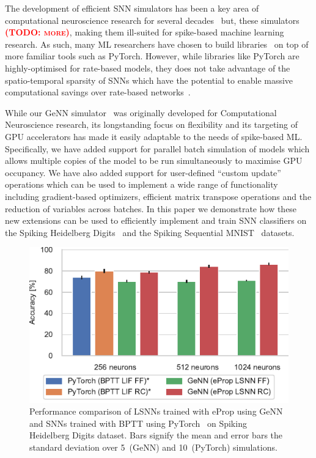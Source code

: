 \documentclass[sigconf,authordraft]{acmart}
\newcommand{\todo}[1]{\textbf{\textsc{\textcolor{red}{(TODO: #1)}}}}
\begin{document}
The development of efficient SNN simulators has been a key area of computational neuroscience research for several decades~\citep{carnevale2006neuron, Gewaltig2007, Golosio2021, Akar2019,Yavuz2016} but, these simulators \todo{more}, making them ill-suited for spike-based machine learning research.
As such, many ML researchers have chosen to build libraries~\citep{norse2021, SpikingJelly, eshraghian2021training,Hazan2018} on top of more familiar tools such as PyTorch.
However, while libraries like PyTorch are highly-optimised for rate-based models, they does not take advantage of the spatio-temporal sparsity of SNNs which have the potential to enable massive computational savings over rate-based networks~\citep{Yin2021}.

While our GeNN simulator~\citep{Yavuz2016,Knight2018,Knight2021} was originally developed for Computational Neuroscience research, its longstanding focus on flexibility and its targeting of GPU accelerators has made it easily adaptable to the needs of spike-based ML.
Specifically, we have added support for parallel batch simulation of models which allows multiple copies of the model to be run simultaneously to maximise GPU occupancy.
We have also added support for user-defined ``custom update'' operations which can be used to implement a wide range of functionality including gradient-based optimizers, efficient matrix transpose operations and the reduction of variables across batches.
In this paper we demonstrate how these new extensions can be used to efficiently implement and train SNN classifiers on the Spiking Heidelberg Digits~\citep{Cramer2020} and the Spiking Sequential MNIST~\citep{Plank2021} datasets.

\begin{figure}[t]
  \centering
  \includegraphics{figures/shd_performance.pdf}
  \caption{Performance comparison of  LSNNs trained with eProp using GeNN and SNNs trained with BPTT using PyTorch~\citep{Zenke2021a} on Spiking Heidelberg Digits dataset.
  Bars signify the mean and error bars the standard deviation over 5~(GeNN) and 10~(PyTorch) simulations.}
  \label{fig:shd_performance}
\end{figure}
\end{document}

